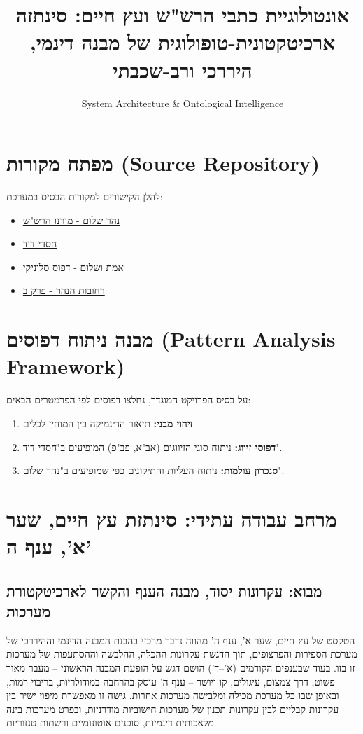 \documentclass{article}
\title{אונטולוגיית כתבי הרש"ש ועץ חיים: סינתזה ארכיטקטונית-טופולוגית של מבנה דינמי, היררכי ורב-שכבתי}
\author{System Architecture \& Ontological Intelligence}
\begin{document}
\maketitle

\section{מפתח מקורות (Source Repository)}
להלן הקישורים למקורות הבסיס במערכת:
\begin{itemize}
    \item \href{run:./נהר-שלום.pdf}{נהר שלום - מורנו הרש"ש}
    \item \href{run:./חסדי-דוד.pdf}{חסדי דוד}
    \item \href{run:./אמת ושלום על עץ דפוס סלוניקי.docx}{אמת ושלום - דפוס סלוניקי}
    \item \href{run:./רחובות הנהר ב 60.htm}{רחובות הנהר - פרק ב}
\end{itemize}

\section{מבנה ניתוח דפוסים (Pattern Analysis Framework)}
על בסיס הפרויקט המוגדר, נחלצו דפוסים לפי הפרמטרים הבאים:
\begin{enumerate}
    \item \textbf{זיהוי מבני:} תיאור הדינמיקה בין המוחין לכלים.
    \item \textbf{דפוסי זיווג:} ניתוח סוגי הזיווגים (אב"א, פב"פ) המופיעים ב"חסדי דוד".
    \item \textbf{סנכרון עולמות:} ניתוח העליות והתיקונים כפי שמופיעים ב"נהר שלום".
\end{enumerate}

\section{מרחב עבודה עתידי: סינתזת עץ חיים, שער א', ענף ה'}

\subsection{מבוא: עקרונות יסוד, מבנה הענף והקשר לארכיטקטורת מערכות}
הטקסט של עץ חיים, שער א', ענף ה' מהווה נדבך מרכזי בהבנת המבנה הדינמי וההיררכי של מערכת הספירות והפרצופים, תוך הדגשת עקרונות ההכלה, ההלבשה וההסתעפות של מערכות זו בזו. בעוד שבענפים הקודמים (א'–ד') הושם דגש על הופעת המבנה הראשוני – מעבר מאור פשוט, דרך צמצום, עיגולים, קו ויושר – ענף ה' עוסק בהרחבה במודולריות, בריבוי רמות, ובאופן שבו כל מערכת מכילה ומלבישה מערכות אחרות. גישה זו מאפשרת מיפוי ישיר בין עקרונות קבליים לבין עקרונות תכנון של מערכות חישוביות מודרניות, ובפרט מערכות בינה מלאכותית דינמיות, סוכנים אוטונומיים ורשתות טנזוריות.
\end{document}
